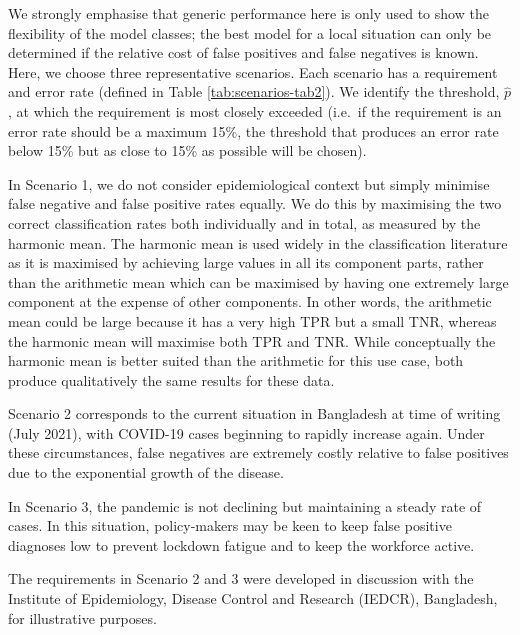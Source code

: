 \documentclass[]{elsarticle} %
\begin{document}
We strongly emphasise that generic performance here is only used to show the flexibility of the model classes; the best model for a local situation can only be determined if the relative cost of false positives and false negatives is known.
Here, we choose three representative scenarios.
Each scenario has a requirement and error rate (defined in Table \ref{tab:scenarios-tab2}).
We identify the threshold, \(\hat{p}\), at which the requirement is most closely exceeded (i.e.~if the requirement is an error rate should be a maximum 15\%, the threshold that produces an error rate below 15\% but as close to 15\% as possible will be chosen).

In Scenario 1, we do not consider epidemiological context but simply minimise false negative and false positive rates equally.
We do this by maximising the two correct classification rates both individually and in total, as measured by the harmonic mean.
The harmonic mean is used widely in the classification literature as it is maximised by achieving large values in all its component parts, rather than the arithmetic mean which can be maximised by having one extremely large component at the expense of other components.
In other words, the arithmetic mean could be large because it has a very high TPR but a small TNR, whereas the harmonic mean will maximise both TPR and TNR.
While conceptually the harmonic mean is better suited than the arithmetic for this use case, both produce qualitatively the same results for these data.

Scenario 2 corresponds to the current situation in Bangladesh at time of writing (July 2021), with COVID-19 cases beginning to rapidly increase again.
Under these circumstances, false negatives are extremely costly relative to false positives due to the exponential growth of the disease.

In Scenario 3, the pandemic is not declining but maintaining a steady rate of cases.
In this situation, policy-makers may be keen to keep false positive diagnoses low to prevent lockdown fatigue and to keep the workforce active.

The requirements in Scenario 2 and 3 were developed in discussion with the Institute of Epidemiology, Disease Control and Research (IEDCR), Bangladesh, for illustrative purposes.
\end{document}
